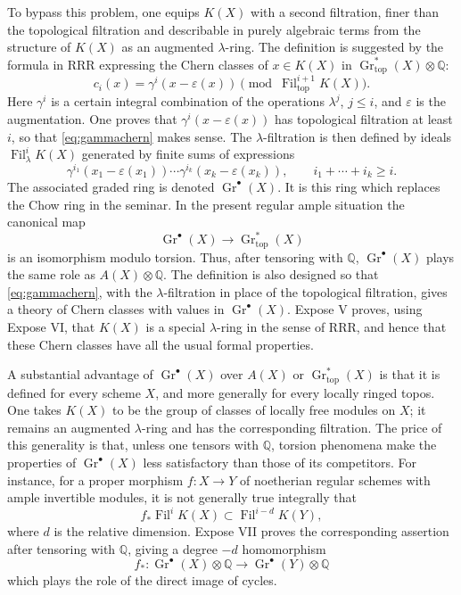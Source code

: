 \documentclass[14pt]{extarticle}
\newcommand{\QQ}{\mathbb Q}
\newcommand{\Fil}{\operatorname{Fil}}
\newcommand{\Gr}{\operatorname{Gr}}
\newcommand{\eps}{\varepsilon}
\begin{document}
To bypass this problem, one equips $K(X)$ with a second filtration, finer than the topological filtration and describable in purely algebraic terms from the structure of $K(X)$ as an augmented $\lambda$-ring. The definition is suggested by the formula in RRR expressing the Chern classes of $x\in K(X)$ in $\Gr^*_{\mathrm{top}}(X)\otimes\QQ$:
\begin{equation}\label{eq:gammachern}
   c_i(x)=\gamma^i(x-\eps(x))\pmod{\Fil^{i+1}_{\mathrm{top}}K(X)}.
\end{equation}
Here $\gamma^i$ is a certain integral combination of the operations $\lambda^j$, $j\leq i$, and $\eps$ is the augmentation. One proves that $\gamma^i(x-\eps(x))$ has topological filtration at least $i$, so that \eqref{eq:gammachern} makes sense. The $\lambda$-filtration is then defined by ideals $\Fil^i_{\lambda}K(X)$ generated by finite sums of expressions
\[
   \gamma^{i_1}(x_1-\eps(x_1))\cdots
   \gamma^{i_k}(x_k-\eps(x_k)),\qquad i_1+\cdots+i_k\geq i.
\]
The associated graded ring is denoted $\Gr^{\bullet}(X)$. It is this ring which replaces the Chow ring in the seminar. In the present regular ample situation the canonical map
\[
   \Gr^{\bullet}(X)\to\Gr^*_{\mathrm{top}}(X)
\]
is an isomorphism modulo torsion. Thus, after tensoring with $\QQ$, $\Gr^{\bullet}(X)$ plays the same role as $A(X)\otimes\QQ$. The definition is also designed so that \eqref{eq:gammachern}, with the $\lambda$-filtration in place of the topological filtration, gives a theory of Chern classes with values in $\Gr^{\bullet}(X)$. Expose V proves, using Expose VI, that $K(X)$ is a special $\lambda$-ring in the sense of RRR, and hence that these Chern classes have all the usual formal properties.

A substantial advantage of $\Gr^{\bullet}(X)$ over $A(X)$ or $\Gr^*_{\mathrm{top}}(X)$ is that it is defined for every scheme $X$, and more generally for every locally ringed topos. One takes $K(X)$ to be the group of classes of locally free modules on $X$; it remains an augmented $\lambda$-ring and has the corresponding filtration. The price of this generality is that, unless one tensors with $\QQ$, torsion phenomena make the properties of $\Gr^{\bullet}(X)$ less satisfactory than those of its competitors. For instance, for a proper morphism $f:X\to Y$ of noetherian regular schemes with ample invertible modules, it is not generally true integrally that
\[
   f_*\Fil^iK(X)\subset \Fil^{i-d}K(Y),
\]
where $d$ is the relative dimension. Expose VII proves the corresponding assertion after tensoring with $\QQ$, giving a degree $-d$ homomorphism
\[
   f_*:\Gr^{\bullet}(X)\otimes\QQ\to \Gr^{\bullet}(Y)\otimes\QQ
\]
which plays the role of the direct image of cycles.
\end{document}
